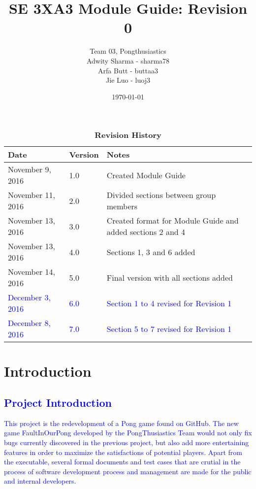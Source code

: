 \documentclass[12pt,letterpaper]{article}
\title{SE 3XA3 Module Guide: Revision 0}
\author{Team 03, Pongthusiastics 		
\\ Adwity Sharma - sharma78 		
\\ Arfa Butt - buttaa3 	
	\\ Jie Luo - luoj3 }
\date{\today}
\begin{document}
\maketitle
\newpage
\tableofcontents

\listoftables
\listoffigures
\begin{table}[h]
\caption{\bf Revision History}
\begin{tabularx}{\textwidth}{p{3.5cm}p{2cm}X}
\toprule {\bf Date} & {\bf Version} & {\bf Notes}\\
\midrule
November 9, 2016 & 1.0 & Created Module Guide \\
November 11, 2016 & 2.0 & Divided sections between group members \\
November 13, 2016 & 3.0 & Created format for Module Guide and added sections 2 and 4 \\
November 13, 2016 & 4.0 & Sections 1, 3 and 6 added \\
November 14, 2016 & 5.0 & Final version with all sections added\\
\textcolor{blue}{December 3, 2016} & \textcolor{blue}{6.0} & \textcolor{blue}{Section 1 to 4 revised for Revision 1}\\
\textcolor{blue}{December 8, 2016} & \textcolor{blue}{7.0} & \textcolor{blue}{Section 5 to 7 revised for Revision 1}\\
\bottomrule
\end{tabularx}
\end{table}

\clearpage
	
	\section{Introduction} \label{intro}

	\subsection{\textcolor{blue}{Project Introduction}}
	\textcolor{blue}{This project is the redevelopment of a Pong game found on GitHub. The new game FaultInOurPong developed by the PongThusiastics Team would not only fix bugs currently discovered in the previous project, but also add more entertaining features in order to maximize the satisfactions of potential players. Apart from the executable, several formal documents and test cases that are crutial in the process of software development process and management are made for the public and internal developers.}\\
\end{document}
